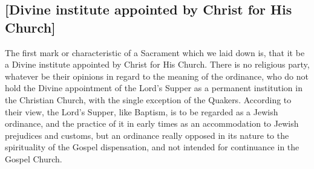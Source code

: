 \documentclass[
]{book}
\begin{document}
\hypertarget{divine-institute-appointed-by-christ-for-his-church}{%
\subsection{{[}Divine institute appointed by Christ for His Church{]}}\label{divine-institute-appointed-by-christ-for-his-church}}

The first mark or characteristic of a Sacrament which we laid down is, that it be a Divine institute appointed by Christ for His Church. There is no religious party, whatever be their opinions in regard to the meaning of the ordinance, who do not hold the Divine appointment of the Lord's Supper as a permanent institution in the Christian Church, with the single exception of the Quakers. According to their view, the Lord's Supper, like Baptism, is to be regarded as a Jewish ordinance, and the practice of it in early times as an accommodation to Jewish prejudices and customs, but an ordinance really opposed in its nature to the spirituality of the Gospel dispensation, and not intended for continuance in the Gospel Church.
\end{document}
